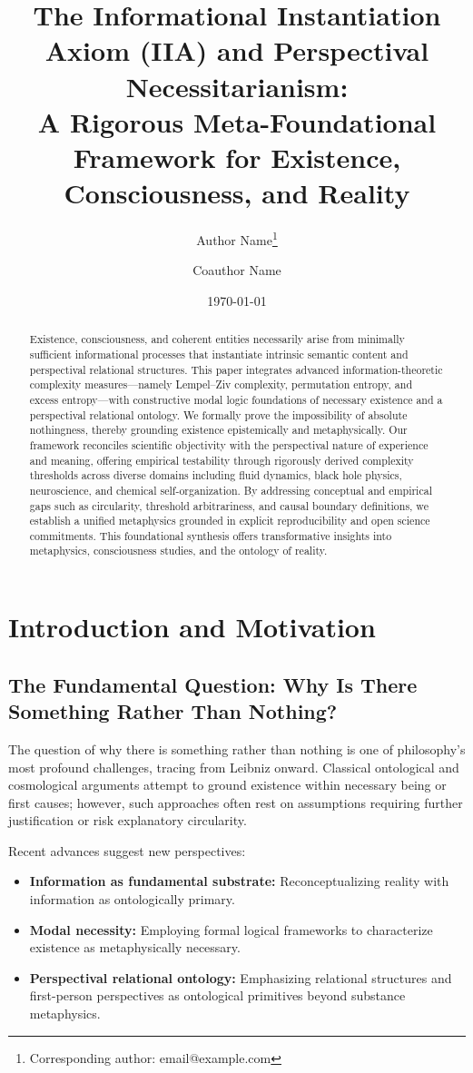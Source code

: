 \documentclass[12pt,a4paper]{article}
\title{\bf The Informational Instantiation Axiom (IIA) and Perspectival Necessitarianism:\\ A Rigorous Meta-Foundational Framework for Existence, Consciousness, and Reality}
\author{Author Name\footnote{Corresponding author: email@example.com} \and Coauthor Name}
\date{\today}
\begin{document}
\maketitle

\begin{abstract}
Existence, consciousness, and coherent entities necessarily arise from minimally sufficient informational processes that instantiate intrinsic semantic content and perspectival relational structures. This paper integrates advanced information-theoretic complexity measures—namely Lempel–Ziv complexity, permutation entropy, and excess entropy—with constructive modal logic foundations of necessary existence and a perspectival relational ontology. We formally prove the impossibility of absolute nothingness, thereby grounding existence epistemically and metaphysically. Our framework reconciles scientific objectivity with the perspectival nature of experience and meaning, offering empirical testability through rigorously derived complexity thresholds across diverse domains including fluid dynamics, black hole physics, neuroscience, and chemical self-organization. By addressing conceptual and empirical gaps such as circularity, threshold arbitrariness, and causal boundary definitions, we establish a unified metaphysics grounded in explicit reproducibility and open science commitments. This foundational synthesis offers transformative insights into metaphysics, consciousness studies, and the ontology of reality.
\end{abstract}

\newpage
\tableofcontents
\newpage

\section{Introduction and Motivation}

\subsection{The Fundamental Question: Why Is There Something Rather Than Nothing?}
The question of why there is something rather than nothing is one of philosophy’s most profound challenges, tracing from Leibniz onward. Classical ontological and cosmological arguments attempt to ground existence within necessary being or first causes; however, such approaches often rest on assumptions requiring further justification or risk explanatory circularity.

Recent advances suggest new perspectives:  
\begin{itemize}
\item \textbf{Information as fundamental substrate:} Reconceptualizing reality with information as ontologically primary.
\item \textbf{Modal necessity:} Employing formal logical frameworks to characterize existence as metaphysically necessary.
\item \textbf{Perspectival relational ontology:} Emphasizing relational structures and first-person perspectives as ontological primitives beyond substance metaphysics.
\end{itemize}
\end{document}
